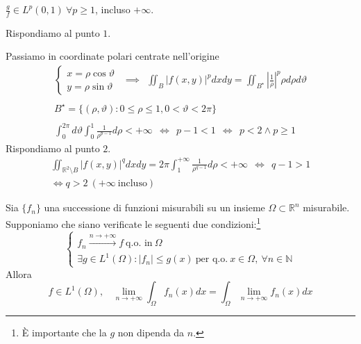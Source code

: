 $\frac{g}{f} \in L^{p}( 0,1) \ \forall p\geqslant 1$, incluso $+\infty $.
\Soluzione

Rispondiamo al punto $1$.

Passiamo in coordinate polari centrate nell'origine
\begin{gather*}
\begin{cases}
x=\rho \cos \vartheta \\
y=\rho \sin \vartheta 
\end{cases} \ \ \implies \ \ \iint _{B}| f( x,y)| ^{p} dxdy=\iint _{B^{\star }}\left| \frac{1}{\rho }\right| ^{p} \rho d\rho d\vartheta \\
\\
B^{\star } =\{( \rho ,\vartheta ) :0\leqslant \rho \leqslant 1,0< \vartheta < 2\pi \}\\
\\
\int ^{2\pi }_{0} d\vartheta \int ^{1}_{0}\frac{1}{\rho ^{p-1}} d\rho < +\infty \ \ \iff \ \ p-1< 1\ \ \iff \ \ p< 2\land p\geqslant 1
\end{gather*}
Rispondiamo al punto $2$.
\begin{gather*}
\iint _{\mathbb{R}^{2} \setminus B}| f( x,y)| ^{q} dxdy=2\pi \int ^{+\infty }_{1}\frac{1}{\rho ^{q-1}} d\rho < +\infty \ \ \iff \ \ q-1 >1\\
\iff q >2\ \left( +\infty \ \text{incluso}\right)
\end{gather*}
\Soluzione
\begin{thm}
 Sia $\{f_{n}\}$ una successione di funzioni misurabili su un insieme $\Omega \subset \mathbb{R}^{n}$ misurabile. Supponiamo che siano verificate le seguenti due condizioni:\footnote{È importante che la $g$ non dipenda da $n$.}
\begin{equation*}
\begin{cases}
f_{n}\xrightarrow{n\rightarrow +\infty } f\ \text{q.o. in} \ \Omega \\
\exists g\in L^{1}( \Omega ) :| f_{n}| \leqslant g( x) \ \text{per q.o.} \ x\in \Omega ,\ \forall n\in \mathbb{N}
\end{cases}
\end{equation*}
Allora
\begin{equation*}
f\in L^{1}( \Omega ) ,\ \ \ \ \lim _{n\rightarrow +\infty }\int _{\Omega } f_{n}( x) dx=\int _{\Omega }\lim _{n\rightarrow +\infty } f_{n}( x) dx
\end{equation*}
\end{thm}
